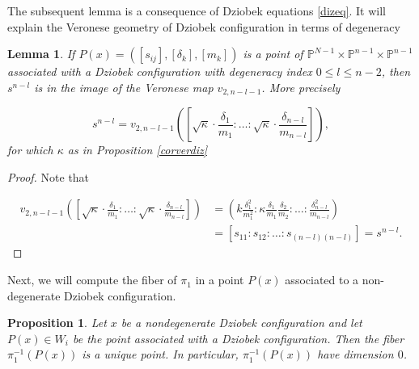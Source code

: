 \documentclass{amsart}
\newtheorem{proposition}[theorem]{Proposition}
\newtheorem{lemma}[theorem]{Lemma}
\theoremstyle{definition}
\theoremstyle{remark}
\numberwithin{equation}{section}
\begin{document}
 
 
The subsequent lemma is a consequence of Dziobek equations \eqref{dizeq}. It will explain the Veronese geometry of Dziobek configuration in terms of degeneracy 

\begin{lemma} \label{lemgeoverdiz}
If $P(x)=([s_{ij}], [\delta_k], [m_k])$ is a point of $\mathbb{P}^{N-1}\times \mathbb{P}^{n-1}\times \mathbb{P}^{n-1}$  associated with a Dziobek configuration with degeneracy index $0 \leq l \leq n-2$, then $s^{n-l}$ is in the image of the Veronese map $v_{2,n-l-1}$. More precisely 

$$s^{n-l}=v_{2,n-l-1}\left( \left[ \sqrt{\kappa} \cdot \frac{\delta_1}{m_1}: \dots : \sqrt{\kappa} \cdot \frac{\delta_{n-l}}{m_{n-l}} \right] \right),$$
for which $\kappa$ as in Proposition \ref{corverdiz}
\end{lemma}

\begin{proof}
Note that

\begin{align*}
    v_{2,n-l-1}\left( \left[ \sqrt{\kappa} \cdot \frac{\delta_1}{m_1}: \dots : \sqrt{\kappa} \cdot \frac{\delta_{n-l}}{m_{n-l}} \right] \right)& =
    (k\frac{\delta_1^2}{m_1^2}: \kappa \frac{\delta_1}{m_1}\frac{\delta_2}{m_2}: \dots : \frac{\delta_{n-l}^2}{m_{n-l}})\\
    &=[s_{11}:s_{12}: \dots: s_{(n-l)(n-l)}]=s^{n-l}.
\end{align*}

\end{proof}


Next, we will compute the fiber of $\pi_1$ in a point $P(x)$ associated to a non-degenerate Dziobek configuration. 

\begin{proposition}\label{nondencase}
Let $x$ be a nondegenerate  Dziobek configuration and let $P(x) \in W_i$ be the point associated with a Dziobek configuration. Then the fiber $\pi_1^{-1}(P(x))$ is a unique point. In particular, $\pi_1^{-1}(P(x))$ have dimension $0$.
\end{proposition}
\end{document}
